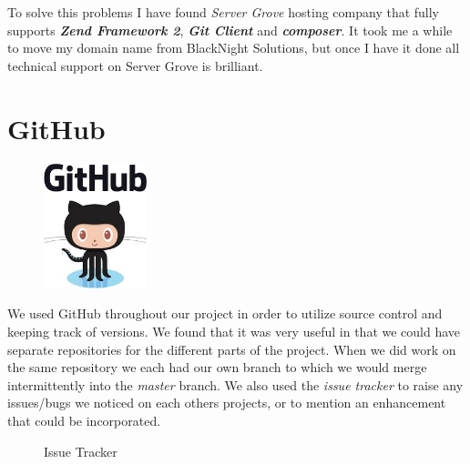 To solve this problems I have found \textit{Server Grove} hosting company that fully supports \textbf{\textit{Zend Framework 2}}, \textbf{\textit{Git Client}} and  \textbf{\textit{composer}}. It took me a while to move my domain name from BlackNight Solutions, but once I have it done all technical support on Server Grove is brilliant.


\pagebreak
  \section{GitHub}
\begin{figure}
\includegraphics[width=3cm]{img/zf2/github-logo.png}
\end{figure} 
We used GitHub \cite{github} throughout our project in order to utilize source control and keeping track of versions.
We found that it was very useful in that we could have separate repositories for the different parts of the project.
When we did work on the same repository we each had our own branch to which we would merge intermittently into the \textit{master} branch.
We also used the \textit{issue tracker} to raise any issues/bugs we noticed on each others projects, or to mention an enhancement that could be incorporated.

\begin{figure}[H] 
	\caption{Issue Tracker}
	\label{fig:speciation}
\end{figure}


